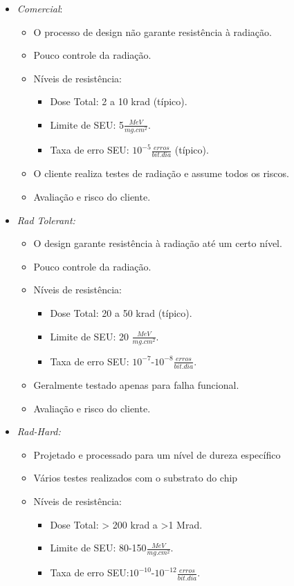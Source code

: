 \begin{itemize}
\item \textit{Comercial}:
	
    \begin{itemize}
    \item O processo de design não garante resistência à radiação.
	\item Pouco controle da radiação.
	\item Níveis de resistência: 
    	
        \begin{itemize}
        \item Dose Total: 2 a 10 krad (típico).
		\item Limite de SEU: 5$\frac{MeV}{mg.cm^{2}}$.
		\item Taxa de erro SEU: $10^{-5}\frac{erros}{bit.dia}$ (típico).
        \end{itemize}
	\item O cliente realiza testes de radiação e assume todos os riscos.
	\item Avaliação e risco do cliente.

    \end{itemize}
    
\item \textit{Rad Tolerant:}
	\begin{itemize}
	\item O design garante resistência à radiação até um certo nível.
	\item Pouco controle da radiação.
	\item Níveis de resistência: 
		\begin{itemize}
		\item Dose Total: 20 a 50 krad (típico).
        \item Limite de SEU: 20 $\frac{MeV}{mg.cm^{2}}$.
		\item Taxa de erro SEU: ${10^{-7}}$-$10^{-8}\frac{erros}{bit.dia}$.
		\end{itemize}  

	\item Geralmente testado apenas para falha funcional.
    \item Avaliação e risco do cliente.

	\end{itemize}

\item \textit{Rad-Hard:}
	\begin{itemize}
	\item Projetado e processado para um nível de dureza específico
	\item Vários testes realizados com o substrato do chip
	\item Níveis de resistência: 
		\begin{itemize}
		\item Dose Total: > 200 krad a >1 Mrad.
        \item Limite de SEU: 80-150$\frac{MeV}{mg.cm^{2}}$.
		\item Taxa de erro SEU:${10^{-10}}$-$10^{-12}\frac{erros}{bit.dia}$.
		\end{itemize}  


\end{itemize}
\end{itemize}
